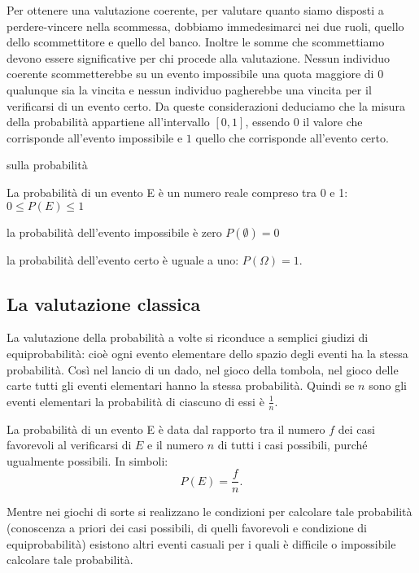 Per ottenere una valutazione coerente, per valutare quanto siamo disposti a 
perdere-vincere nella scommessa, dobbiamo immedesimarci nei due ruoli, quello 
dello scommettitore e quello del banco. Inoltre le somme che scommettiamo 
devono 
essere significative per chi procede alla valutazione.
Nessun individuo coerente scommetterebbe su un evento impossibile una quota 
maggiore di 0 qualunque sia la vincita e nessun individuo pagherebbe una 
vincita 
per il verificarsi di un evento certo.
Da queste considerazioni deduciamo che la misura della probabilità appartiene 
all'intervallo $[0,1]$, essendo $ 0 $ il valore che corrisponde all'evento 
impossibile e $1$ quello che corrisponde all'evento certo.

% 
% 
% 
% 
\begin{definizione}{sulla probabilità}

La probabilità di un evento E è un numero reale compreso tra 0 e 1: $0\le 
P(E)\le 1$

la probabilità dell'evento impossibile è zero $P(\emptyset )=0$

la probabilità dell'evento certo è uguale a uno: $P(\Omega )=1$.
\end{definizione}

\subsection{La valutazione classica}

La valutazione della probabilità a volte si riconduce a semplici giudizi di 
equiprobabilità: cioè ogni evento elementare dello spazio degli eventi ha la 
stessa probabilità. Così nel lancio di un dado, nel gioco della tombola, nel 
gioco delle carte tutti gli eventi elementari hanno la stessa probabilità. 
Quindi se $n$ sono gli eventi elementari la probabilità di ciascuno di essi è 
$\frac 1 n$.

La probabilità di un evento E è data dal rapporto tra il numero $f$ dei casi 
favorevoli al verificarsi di $E$ e il numero $n$ di tutti i casi possibili, 
purché ugualmente possibili. In simboli: \[ P(E)=\dfrac f n. \]

Mentre nei giochi di sorte si realizzano le condizioni per calcolare tale 
probabilità (conoscenza a priori dei casi possibili, di quelli favorevoli e 
condizione di equiprobabilità) esistono altri eventi casuali per i quali è 
difficile o impossibile calcolare tale probabilità.

